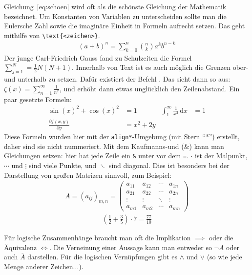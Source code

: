 Gleichung~\eqref{eq:schoen} wird oft als die schönste Gleichung der Mathematik bezeichnet. Um Konstanten von Variablen zu unterscheiden sollte man die Eulersche Zahl sowie die imaginäre Einheit in Formeln aufrecht setzen. Das geht mithilfe von \newline \lstinline!\text{<zeichen>}!. 
%
\begin{align}
\label{eq:binomial}
(a+b)^n = \sum_{k = 0}^{n} \binom{n}{k} a^k b^{n-k}
\end{align}	
%	
Der junge Carl-Friedrich Gauss fand zu Schulzeiten die Formel $\sum_{j = 1}^N = \frac{1}{2}N(N+1)$. Innerhalb von Text ist es auch möglich die Grenzen ober- und unterhalb zu setzen. Dafür existiert der Befehl {}. Das sieht dann so aus: $\zeta(x) = \sum\limits_{n=1}^{\infty} \frac{1}{n^x}$, und erhöht dann etwas unglücklich den Zeilenabstand. Ein paar gesetzte Formeln: %
%
\begin{align*}
\sin(x)^2 + \cos(x)^2 & = 1 &
\int_{1}^{\infty} \frac{1}{x^2} \, \textrm{d}x & = 1 \\
\frac{\partial f(x, y)}{\partial y} & = x^2 + 2y
\end{align*}
%
Diese Formeln wurden hier mit der \texttt{align*}-Umgebung (mit Stern "`*"') erstellt, daher sind sie nicht nummeriert. Mit dem Kaufmanns-und (\&) kann man Gleichungen setzen: hier hat jede Zeile ein \texttt{\&} unter vor dem \texttt{=}.  $\cdot$ ist der Malpunkt, $\cdots$ und $\vdots$ sind viele Punkte, und $\ddots$ sind diagonal. Dies ist besonders bei der Darstellung von großen Matrizen sinnvoll, zum Beispiel:
%
\begin{align*}
A= (a_{ij})_{m,n} = \begin{pmatrix} a_{11} & a_{12} & \cdots & a_{1n} \\ a_{21} & a_{22} & \cdots & a_{2n} \\ \vdots  & \vdots & \ddots & \vdots \\  a_{m1} & a_{m2} & \cdots & a_{mn} \end{pmatrix} 
\end{align*}
%
\begin{align*}
\left(\frac{1}{2} + \frac{3}{5}\right) \cdot 7 = \frac{77}{10}
\end{align*}

Für logische Zusammenhänge braucht man oft die Implikation $\implies$ oder die Äquivalenz $\iff$. Die Verneinung einer Aussage kann man entweder so $\neg A$ oder auch $\overline{A}$ darstellen. Für die logischen Vernüpfungen gibt es $\wedge$ und $\vee$ (so wie jede Menge anderer Zeichen...). 

